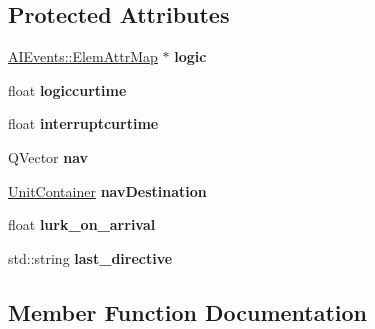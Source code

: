 \subsection*{Protected Attributes}
\begin{DoxyCompactItemize}
\item 
\hyperlink{structAIEvents_1_1ElemAttrMap}{A\+I\+Events\+::\+Elem\+Attr\+Map} $\ast$ {\bfseries logic}\hypertarget{classOrders_1_1AggressiveAI_ac311c77690f99887ee52284483cc07de}{}\label{classOrders_1_1AggressiveAI_ac311c77690f99887ee52284483cc07de}

\item 
float {\bfseries logiccurtime}\hypertarget{classOrders_1_1AggressiveAI_a72819389ebb0a5a9baf3ffa876e65c33}{}\label{classOrders_1_1AggressiveAI_a72819389ebb0a5a9baf3ffa876e65c33}

\item 
float {\bfseries interruptcurtime}\hypertarget{classOrders_1_1AggressiveAI_a427af043e4c1bb71c1d853d7f2764713}{}\label{classOrders_1_1AggressiveAI_a427af043e4c1bb71c1d853d7f2764713}

\item 
Q\+Vector {\bfseries nav}\hypertarget{classOrders_1_1AggressiveAI_ac4a5c4e0319f3be6259bac9a328fdf5b}{}\label{classOrders_1_1AggressiveAI_ac4a5c4e0319f3be6259bac9a328fdf5b}

\item 
\hyperlink{classUnitContainer}{Unit\+Container} {\bfseries nav\+Destination}\hypertarget{classOrders_1_1AggressiveAI_a2652faf0ba7dd55da73e9a22295436d7}{}\label{classOrders_1_1AggressiveAI_a2652faf0ba7dd55da73e9a22295436d7}

\item 
float {\bfseries lurk\+\_\+on\+\_\+arrival}\hypertarget{classOrders_1_1AggressiveAI_af28f0643740268f86c9dd5b87b02bf7e}{}\label{classOrders_1_1AggressiveAI_af28f0643740268f86c9dd5b87b02bf7e}

\item 
std\+::string {\bfseries last\+\_\+directive}\hypertarget{classOrders_1_1AggressiveAI_ae918b0850afbf3ff860e66b807e4d3e2}{}\label{classOrders_1_1AggressiveAI_ae918b0850afbf3ff860e66b807e4d3e2}

\end{DoxyCompactItemize}


\subsection{Member Function Documentation}
